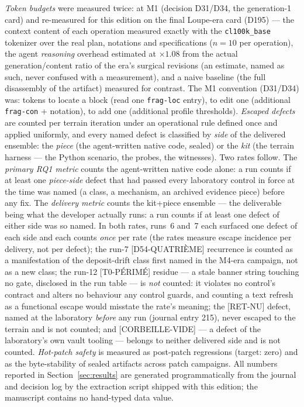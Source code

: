 \documentclass[11pt,a4paper]{article}
\newcommand{\code}[1]{\texttt{\small #1}}
\begin{document}
\emph{Token budgets} were measured twice: at M1 (decision D31/D34, the
generation-1 card) and re-measured for this edition on the final
Loupe-era card (D195) --- the context content of each operation measured
exactly with the \code{cl100k\_base} tokenizer over the real plan,
notations and specifications ($n{=}10$ per operation), the agent
\emph{reasoning} overhead estimated at $\times 1.08$ from the actual
generation/content ratio of the era's surgical revisions (an estimate,
named as such, never confused with a measurement), and a naive baseline
(the full disassembly of the artifact) measured for contrast. The M1
convention (D31/D34) was:
tokens to locate a block (read one \code{frag-loc} entry), to edit one
(additional \code{frag-con} + notation), to add one (additional
profile thresholds). \emph{Escaped defects} are counted per terrain
iteration under an operational rule defined once and applied uniformly,
and every named defect is classified by \emph{side} of the delivered
ensemble: the \emph{piece} (the agent-written native code, sealed) or
the \emph{kit} (the terrain harness --- the Python scenario, the
probes, the witnesses). Two rates follow. The \emph{primary RQ1
metric} counts the agent-written native code alone: a run counts if at
least one \emph{piece-side} defect that had passed every laboratory
control in force at the time was named (a class, a mechanism, an
archived evidence piece) before any fix. The \emph{delivery metric}
counts the kit+piece ensemble --- the deliverable being what the
developer actually runs: a run counts if at least one defect of either
side was so named. In both rates, runs~6 and~7 each surfaced one defect
of each side and each counts \emph{once} per rate (the rates measure
escape incidence per delivery, not per defect); the run-7
[D54-QUATRI\`EME] recurrence is counted as a manifestation of the
deposit-drift class first named in the M4-era campaign, not as a new
class; the run-12 [T0-P\'ERIM\'E] residue --- a stale banner string
touching no gate, disclosed in the run table --- is \emph{not} counted:
it violates no control's contract and alters no behaviour any control
guards, and counting a text refresh as a functional escape would
misstate the rate's meaning; the [RET-NU] defect, named at the
laboratory \emph{before} any run (journal entry 215), never escaped to
the terrain and is not counted; and [CORBEILLE-VIDE] --- a defect of
the laboratory's own vault tooling --- belongs to neither delivered
side and is not counted.
\emph{Hot-patch safety} is measured as post-patch regressions (target:
zero) and as the byte-stability of sealed artifacts across patch
campaigns. All numbers reported in Section~\ref{sec:results} are
generated programmatically from the journal and decision log by the
extraction script shipped with this edition; the manuscript contains no
hand-typed data value.
\end{document}
